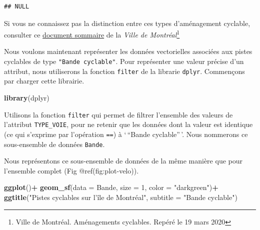 \documentclass[]{article}
\newenvironment{Shaded}{\begin{snugshade}}{\end{snugshade}}
\newcommand{\KeywordTok}[1]{\textcolor[rgb]{0.13,0.29,0.53}{\textbf{#1}}}
\newcommand{\DataTypeTok}[1]{\textcolor[rgb]{0.13,0.29,0.53}{#1}}
\newcommand{\DecValTok}[1]{\textcolor[rgb]{0.00,0.00,0.81}{#1}}
\newcommand{\StringTok}[1]{\textcolor[rgb]{0.31,0.60,0.02}{#1}}
\newcommand{\OperatorTok}[1]{\textcolor[rgb]{0.81,0.36,0.00}{\textbf{#1}}}
\newcommand{\NormalTok}[1]{#1}
\begin{document}
\begin{verbatim}
## NULL
\end{verbatim}

Si vous ne connaissez pas la distinction entre ces types d'aménagement
cyclable, consulter ce
\href{Module3/3_Amenagement3Cyclable3Mtl.pdf}{document sommaire} de la
\emph{Ville de Montréal}\footnote{Ville de Montréal. Aménagements
  cyclables. Repéré le 19 mars 2020}

Nous voulons maintenant représenter les données vectorielles associées
aux pistes cyclables de type \texttt{"Bande\ cyclable"}. Pour
représenter une valeur précise d'un attribut, nous utiliserons la
fonction \texttt{filter} de la librarie \texttt{dplyr}. Commençons par
charger cette librairie.

\begin{Shaded}
\begin{Highlighting}[]
\KeywordTok{library}\NormalTok{(dplyr)}
\end{Highlighting}
\end{Shaded}

Utilisons la fonction \texttt{filter} qui permet de filtrer l'ensemble
des valeurs de l'attribut \texttt{TYPE\_VOIE}, pour ne retenir que les
données dont la valeur est identique (ce qui s'exprime par l'opération
\texttt{==}) à `\,``Bande cyclable''\,'. Nous nommerons ce sous-ensemble
de données \texttt{Bande}.

\begin{Shaded}
\end{Shaded}

Nous représentons ce sous-ensemble de données de la même manière que
pour l'ensemble complet (Fig @ref(fig:plot-velo)).

\begin{Shaded}
\begin{Highlighting}[]
\KeywordTok{ggplot}\NormalTok{()}\OperatorTok{+}
\StringTok{  }\KeywordTok{geom_sf}\NormalTok{(}\DataTypeTok{data =}\NormalTok{ Bande,  }\DataTypeTok{size =} \DecValTok{1}\NormalTok{, }\DataTypeTok{color =} \StringTok{"darkgreen"}\NormalTok{)}\OperatorTok{+}
\StringTok{  }\KeywordTok{ggtitle}\NormalTok{(}\StringTok{"Pistes cyclables sur l'île de Montréal"}\NormalTok{, }\DataTypeTok{subtitle =} \StringTok{"Bande cyclable"}\NormalTok{)}
\end{Highlighting}
\end{Shaded}
\end{document}
